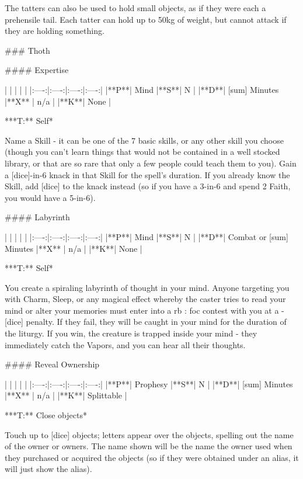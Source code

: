 The tatters can also be used to hold small objects, as if they were each a prehensile tail.  Each tatter can hold up to 50kg of weight, but cannot attack if they are holding something.



### Thoth





#### Expertise

| | | | |
|:----:|:----:|:----:|:----:|
|**P**| Mind |**S**|  N |
|**D**| [sum] Minutes |**X** |  n/a  |
|**K**| None |


***T:**   Self*



Name a Skill - it can be one of the 7 basic skills, or any other skill you choose (though you can't learn things that would not be contained in a well stocked library, or that are so rare that only a few people could teach them to you).  Gain a [dice]-in-6 {knack} in that Skill for the spell's duration.  If you already know the Skill, add [dice] to the {knack} instead (so if you have a 3-in-6 and spend 2 Faith, you would have a 5-in-6).





#### Labyrinth

| | | | |
|:----:|:----:|:----:|:----:|
|**P**| Mind |**S**|  N |
|**D**| Combat or [sum] Minutes |**X** |  n/a  |
|**K**| None |


***T:**   Self*



You create a spiraling labyrinth of thought in your mind.  Anyone targeting you with Charm, Sleep, or any magical effect whereby the caster tries to read your mind or alter your memories must enter into a {rb} : {foc} contest with you at a -[dice] penalty.  If they fail, they will be caught in your mind for the duration of the liturgy.  If you win, the creature is trapped inside your mind - they immediately catch the Vapors, and you can hear all their thoughts.




#### Reveal Ownership

| | | | |
|:----:|:----:|:----:|:----:|
|**P**| Prophesy |**S**|  N |
|**D**| [sum] Minutes |**X** |  n/a  |
|**K**| Splittable |

***T:**   Close objects*



Touch up to [dice] objects; letters appear over the objects, spelling out the name of the owner or owners.  The name shown will be the name the owner used when they purchased or acquired the objects (so if they were obtained under an alias, it will just show the alias). 

